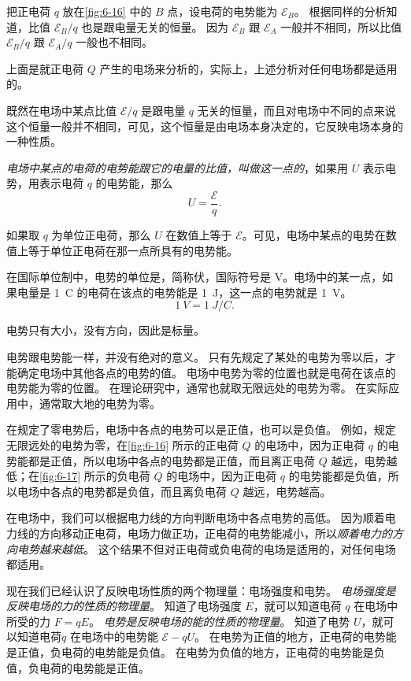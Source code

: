 把正电荷 $q$ 放在\cref{fig:6-16} 中的 $B$ 点，设电荷的电势能为 $\mathcal{E}_B$。
根据同样的分析知道，比值 $\mathcal{E}_B/q$ 也是跟电量无关的恒量。
因为 $\mathcal{E}_B$ 跟 $\mathcal{E}_A$ 一般并不相同，所以比值 $\mathcal{E}_B/q$ 跟 $\mathcal{E}_A/q$ 一般也不相同。

上面是就正电荷 $Q$ 产生的电场来分析的，实际上，上述分析对任何电场都是适用的。

既然在电场中某点比值 $\mathcal{E}/q$ 是跟电量 $q$ 无关的恒量，而且对电场中不同的点来说这个恒量一般并不相同，可见，这个恒量是由电场本身决定的，它反映电场本身的一种性质。

\emph{电场中某点的电荷的电势能跟它的电量的比值，叫做这一点的}，如果用 $U$ 表示电势，用表示电荷 $q$ 的电势能，那么
\[U=\frac{\mathcal{E}}{q}.\]

如果取 $q$ 为单位正电荷，那么 $U$ 在数值上等于 $\mathcal{E}$。可见，电场中某点的电势在数值上等于单位正电荷在那一点所具有的电势能。

在国际单位制中，电势的单位是，简称伏，国际符号是 \unit{V}。电场中的某一点，如果电量是 \qty{1}{C} 的电荷在该点的电势能是 \qty{1}{J}，这一点的电势就是 \qty{1}{V}。
\[ \qty{1}{V}=\qty{1}{J/C}.\]

电势只有大小，没有方向，因此是标量。

电势跟电势能一样，并没有绝对的意义。
只有先规定了某处的电势为零以后，才能确定电场中其他各点的电势的值。
电场中电势为零的位置也就是电荷在该点的电势能为零的位置。
在理论研究中，通常也就取无限远处的电势为零。
在实际应用中，通常取大地的电势为零。

在规定了零电势后，电场中各点的电势可以是正值，也可以是负值。
例如，规定无限远处的电势为零，在\cref{fig:6-16} 所示的正电荷 $Q$ 的电场中，因为正电荷 $q$ 的电势能都是正值，所以电场中各点的电势都是正值，而且离正电荷 $Q$ 越远，电势越低；在\cref{fig:6-17} 所示的负电荷 $Q$ 的电场中，因为正电荷 $q$ 的电势能都是负值，所以电场中各点的电势都是负值，而且离负电荷 $Q$ 越远，电势越高。

在电场中，我们可以根据电力线的方向判断电场中各点电势的高低。
因为顺着电力线的方向移动正电荷，电场力做正功，正电荷的电势能减小，所以\emph{顺着电力的方向电势越来越低}。
这个结果不但对正电荷或负电荷的电场是适用的，对任何电场都适用。

现在我们已经认识了反映电场性质的两个物理量：电场强度和电势。
\emph{电场强度是反映电场的力的性质的物理量}。
知道了电场强度 $E$，就可以知道电荷 $q$ 在电场中所受的力 $F=qE$。
\emph{电势是反映电场的能的性质的物理量}。
知道了电势 $U$，就可以知道电荷$q$ 在电场中的电势能 $\mathcal{E}-qU$。
在电势为正值的地方，正电荷的电势能是正值，负电荷的电势能是负值。
在电势为负值的地方，正电荷的电势能是负值，负电荷的电势能是正值。

